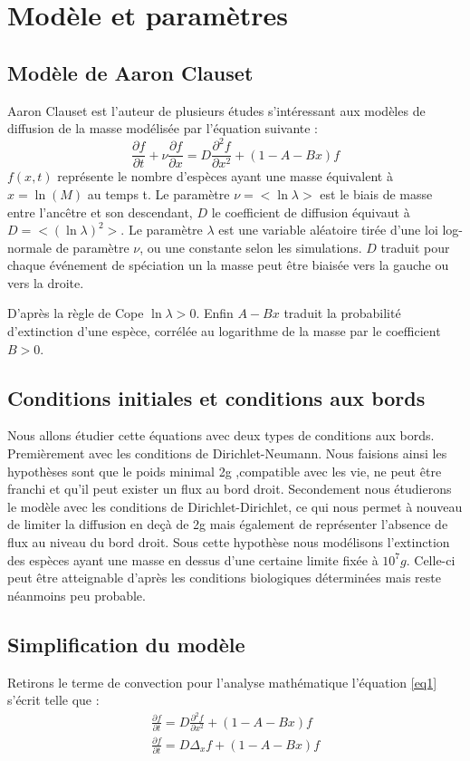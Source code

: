 \documentclass[fleqn,10pt]{SelfArx}
\begin{document}
\section*{Modèle et paramètres}
\subsection*{Modèle de Aaron Clauset}
Aaron Clauset \cite{clauset2008many}\cite{clauset2013large} est l'auteur de plusieurs études s'intéressant aux modèles de diffusion de la masse modélisée par l'équation suivante :
\begin{equation}
\frac{\partial f}{\partial t}+\nu \frac{\partial f}{\partial x} = D \frac{\partial^2 f}{\partial x^2} + (1-A-Bx)f 
\label{eq1}
\end{equation}
$f(x,t)$ représente le nombre d'espèces ayant une masse équivalent à $x=\ln(M)$ au temps t. Le paramètre $\nu = <\ln\lambda>$ est le biais de masse entre l'ancêtre et son descendant, $D$ le coefficient de diffusion équivaut à $D=<(\ln\lambda)^2>$. Le paramètre $\lambda$ est une variable aléatoire tirée d'une loi log-normale de paramètre $\nu$, ou une constante selon les simulations.  $D$ traduit pour chaque événement de spéciation un la masse peut être biaisée vers la gauche ou vers la droite. 

 D'après la règle de Cope $\ln\lambda >0$. Enfin $A-Bx$ traduit la probabilité d'extinction d'une espèce, corrélée au logarithme de la masse par le coefficient $B>0$.\\
\subsection*{Conditions initiales et conditions aux bords}
Nous allons étudier cette équations avec deux types de conditions aux bords. Premièrement avec les conditions de Dirichlet-Neumann. Nous faisions ainsi les hypothèses sont que le poids minimal 2g ,compatible avec les vie, ne peut être franchi et qu'il peut exister un flux au bord droit. Secondement nous étudierons le modèle avec les conditions de Dirichlet-Dirichlet, ce qui nous permet à nouveau de limiter la diffusion en deçà de 2g mais également de représenter l'absence de flux au niveau du bord droit. Sous cette hypothèse nous modélisons l'extinction des espèces ayant une masse en dessus d'une certaine limite fixée à $10^7g$. Celle-ci peut être atteignable d'après les conditions biologiques déterminées mais reste néanmoins peu probable.  

\subsection*{Simplification du modèle}
Retirons le terme de convection pour l'analyse mathématique l'équation \ref{eq1} s'écrit telle que :
\begin{align}
\frac{\partial f}{\partial t}= D \frac{\partial^2 f}{\partial x^2} + (1-A-Bx)f \nonumber\\
\frac{\partial f}{\partial t}= D \Delta_xf+ (1-A-Bx)f \label{eq2}
\end{align}
\end{document}
